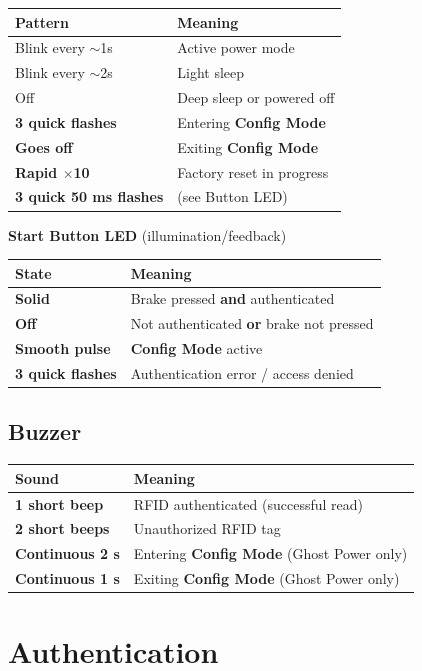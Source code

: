 \documentclass[11pt]{article}
\begin{document}
\begin{tabularx}{\linewidth}{@{}lY@{}}
\toprule
\textbf{Pattern} & \textbf{Meaning}\\
\midrule
Blink every \(\sim\)1s & Active power mode \\
Blink every \(\sim\)2s & Light sleep \\
Off & Deep sleep or powered off \\
\textbf{3 quick flashes} & Entering \textbf{Config Mode} \\
\textbf{Goes off} & Exiting \textbf{Config Mode} \\
\textbf{Rapid \(\times\)10} & Factory reset in progress \\
\textbf{3 quick 50 ms flashes} & (see Button LED) \\
\bottomrule
\end{tabularx}

\medskip
\textbf{Start Button LED} (illumination/feedback)

\begin{tabularx}{\linewidth}{@{}lY@{}}
\toprule
\textbf{State} & \textbf{Meaning}\\
\midrule
\textbf{Solid} & Brake pressed \textbf{and} authenticated \\
\textbf{Off} & Not authenticated \textbf{or} brake not pressed \\
\textbf{Smooth pulse} & \textbf{Config Mode} active \\
\textbf{3 quick flashes} & Authentication error / access denied \\
\bottomrule
\end{tabularx}

\subsection{Buzzer}
\begin{tabularx}{\linewidth}{@{}lY@{}}
\toprule
\textbf{Sound} & \textbf{Meaning}\\
\midrule
\textbf{1 short beep} & RFID authenticated (successful read) \\
\textbf{2 short beeps} & Unauthorized RFID tag \\
\textbf{Continuous 2 s} & Entering \textbf{Config Mode} (Ghost Power only) \\
\textbf{Continuous 1 s} & Exiting \textbf{Config Mode} (Ghost Power only) \\
\bottomrule
\end{tabularx}

\section{Authentication}
\end{document}
